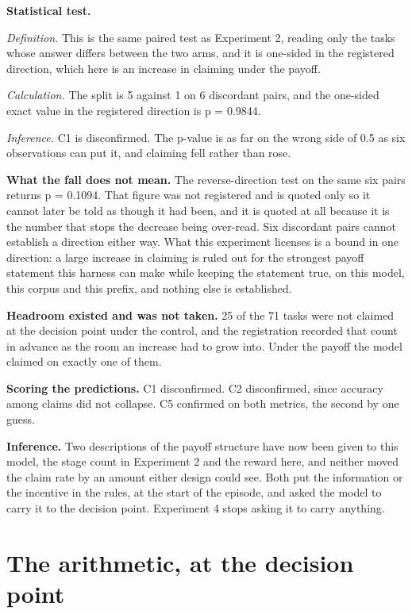 \documentclass[11pt]{article}
\begin{document}
\textbf{Statistical test.}

\emph{Definition.} This is the same paired test as Experiment 2, reading only the tasks whose answer differs between the two arms, and it is one-sided in the registered direction, which here is an increase in claiming under the payoff.

\emph{Calculation.} The split is 5 against 1 on 6 discordant pairs, and the one-sided exact value in the registered direction is p = 0.9844.

\emph{Inference.} C1 is disconfirmed. The p-value is as far on the wrong side of 0.5 as six observations can put it, and claiming fell rather than rose.

\textbf{What the fall does not mean.} The reverse-direction test on the same six pairs returns p = 0.1094. That figure was not registered and is quoted only so it cannot later be told as though it had been, and it is quoted at all because it is the number that stops the decrease being over-read. Six discordant pairs cannot establish a direction either way. What this experiment licenses is a bound in one direction: a large increase in claiming is ruled out for the strongest payoff statement this harness can make while keeping the statement true, on this model, this corpus and this prefix, and nothing else is established.

\textbf{Headroom existed and was not taken.} 25 of the 71 tasks were not claimed at the decision point under the control, and the registration recorded that count in advance as the room an increase had to grow into. Under the payoff the model claimed on exactly one of them.

\textbf{Scoring the predictions.} C1 disconfirmed. C2 disconfirmed, since accuracy among claims did not collapse. C5 confirmed on both metrics, the second by one guess.

\textbf{Inference.} Two descriptions of the payoff structure have now been given to this model, the stage count in Experiment 2 and the reward here, and neither moved the claim rate by an amount either design could see. Both put the information or the incentive in the rules, at the start of the episode, and asked the model to carry it to the decision point. Experiment 4 stops asking it to carry anything.

\section{The arithmetic, at the decision point}
\end{document}
